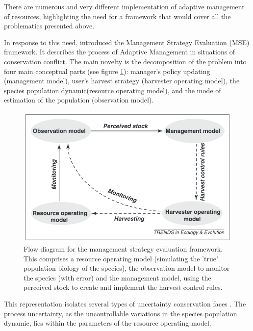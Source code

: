 \documentclass[12pt,a4paper]{article}
\begin{document}
There are numerous and very different implementation of adaptive management of resources, highlighting the need for a framework that would cover all the problematics presented above. 


In response to this need, \cite{BUNNEFELD2011441} introduced the Management Strategy Evaluation (MSE) framework.
It describes the process of Adaptive Management in situations of conservation conflict.
The main novelty is the decomposition of the problem into four main conceptual parts (see figure \ref{msediagram}): manager's policy updating (management model), user's harvest strategy (harvester operating model), the species population dynamic(resource operating model), and the mode of estimation of the population (observation model).
\begin{figure}
	\centering
	\includegraphics[scale=0.5]{msediagram.png}
	\caption{Flow diagram for the management strategy evaluation framework. This comprises a resource operating model (simulating the 'true' population biology of the species), the observation model to monitor the species (with error) and the management model, using the perceived stock to create and implement the harvest control rules. \citep{BUNNEFELD2011441}}
	\label{msediagram}
\end{figure}
This representation isolates several types of uncertainty conservation faces \citep{BUNNEFELD2011441}.
The process uncertainty, as the uncontrollable variations in the species population dynamic, lies within the parameters of the resource operating model.
\end{document}
